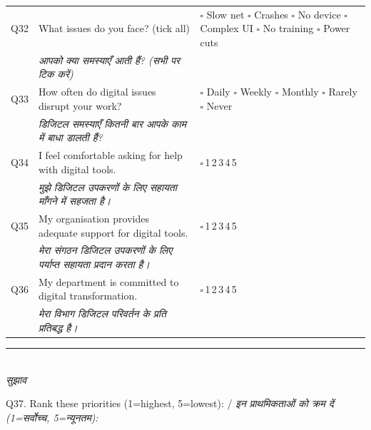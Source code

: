 \documentclass[10pt,a4paper]{article}
\newcommand{\likert}{{\Large$\square$}\,1\quad{\Large$\square$}\,2\quad{\Large$\square$}\,3\quad{\Large$\square$}\,4\quad{\Large$\square$}\,5}
\begin{document}
\noindent\begin{tabularx}{\textwidth}{@{}L{0.8cm} X L{5.2cm}@{}}
Q32 & What issues do you face? (tick all) & {\Large$\square$} Slow net {\Large$\square$} Crashes {\Large$\square$} No device {\Large$\square$} Complex UI {\Large$\square$} No training {\Large$\square$} Power cuts \\
 & {\hindifont\small\itshape\color{black!70} आपको क्या समस्याएँ आती हैं? (सभी पर टिक करें)} & \\[3pt]
Q33 & How often do digital issues disrupt your work? & {\Large$\square$} Daily {\Large$\square$} Weekly {\Large$\square$} Monthly {\Large$\square$} Rarely {\Large$\square$} Never \\
 & {\hindifont\small\itshape\color{black!70} डिजिटल समस्याएँ कितनी बार आपके काम में बाधा डालती हैं?} & \\[3pt]
Q34 & I feel comfortable asking for help with digital tools. & \likert \\
 & {\hindifont\small\itshape\color{black!70} मुझे डिजिटल उपकरणों के लिए सहायता माँगने में सहजता है।} & \\[3pt]
Q35 & My organisation provides adequate support for digital tools. & \likert \\
 & {\hindifont\small\itshape\color{black!70} मेरा संगठन डिजिटल उपकरणों के लिए पर्याप्त सहायता प्रदान करता है।} & \\[3pt]
Q36 & My department is committed to digital transformation. & \likert \\
 & {\hindifont\small\itshape\color{black!70} मेरा विभाग डिजिटल परिवर्तन के प्रति प्रतिबद्ध है।} & \\[3pt]
\end{tabularx}
\vspace{3pt}
\noindent\rule{\textwidth}{0.3pt}\vspace{3pt}
\\
{\hindifont\itshape\color{black!70} सुझाव}\vspace{3pt}

\noindent Q37. Rank these priorities (1=highest, 5=lowest): / {\hindifont\small\itshape\color{black!70} इन प्राथमिकताओं को क्रम दें (1=सर्वोच्च, 5=न्यूनतम):}\vspace{3pt}
\end{document}
